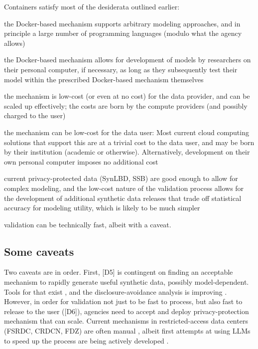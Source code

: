 \documentclass[inline]{hdsr}
\begin{document}
Containers satisfy most of the desiderata outlined earlier: 
\begin{enumerate*}[label={[D\arabic*]}, itemjoin={{; }}, itemjoin*={{, and }}]
    \item the Docker-based mechanism supports arbitrary modeling approaches, and in principle a large number of programming languages (modulo what the agency allows)
    \item the Docker-based mechanism  allows for development of models by researchers on their personal computer, if necessary, as long as they subsequently test their model within the prescribed Docker-based mechanism themselves
    \item the mechanism is low-cost (or even at no cost) for the data provider, and can be scaled up effectively; the costs are born by the compute providers (and possibly charged to the user)
    \item the mechanism can be low-cost for the data user: Most current cloud computing solutions that support this are at a trivial cost to the data user, and may be born by their institution (academic or otherwise). Alternatively, development on their own personal computer imposes no additional cost
    \item current privacy-protected data (SynLBD, SSB) are  good enough to allow for complex modeling, and the low-cost nature of the validation process allows for the development of additional synthetic data releases that trade off statistical accuracy for modeling utility, which is likely to be much simpler
    \item validation can be technically fast, albeit with a caveat.
\end{enumerate*}

\subsection{Some caveats}

Two caveats are in order. First, [D5] is contingent on finding an acceptable mechanism to rapidly generate useful synthetic data, possibly model-dependent. Tools for that exist \citep{synthpop,synthpop2016}, and the disclosure-avoidance analysis is improving \citep{SnokeEtAl2017}. However, in order for validation not just to be fast to process, but also fast to release to the user ([D6]), agencies need to accept and deploy privacy-protection mechanism that can scale. Current mechanisms in restricted-access data centers (FSRDC, \ac{CRDCN}, \ac{FDZ}) are often manual \citep{brandt_guidelines_2010}, albeit first attempts at using \acp{LLM} to speed up the process are being actively developed \citep{rigaud_checking_2023}.
\end{document}
